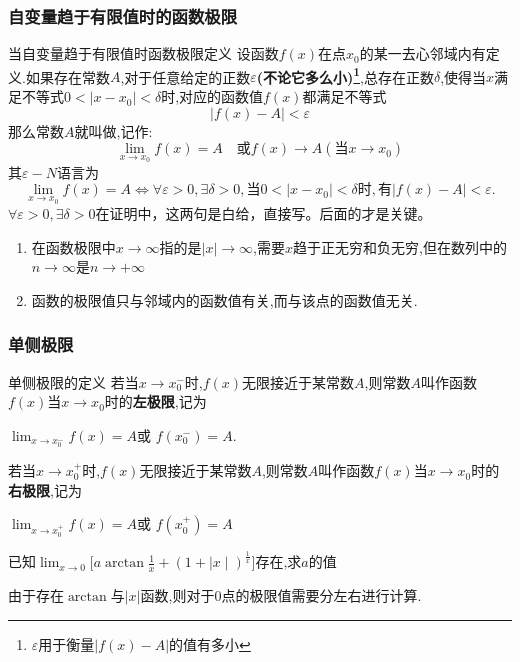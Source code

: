 \documentclass[12pt, a4paper, oneside, UTF8]{ctexbook}
\begin{document}
\begin{sloppypar}
    \subsubsection{自变量趋于有限值时的函数极限}
    \begin{defn}{当自变量趋于有限值时函数极限定义}{}
        设函数$f(x)$在点$x_0$的某一去心邻域内有定义.如果存在常数$A$,对于任意给定的正数$\varepsilon$\textbf{(不论它多么小)\footnote{$\varepsilon$用于衡量$|f(x)-A|$的值有多小}},总存在正数$\delta$,使得当$x$满足不等式$0<|x-x_0|<\delta$时,对应的函数值$f(x)$都满足不等式
        $$
            |f(x)-A|<\varepsilon
        $$
        那么常数$A$就叫做,记作:
        $$
            \lim_{x\to x_0}f(x)=A\quad\text{或}f(x)\to A(\text{当}x\to x_0)
        $$
        其$\varepsilon-N$语言为
        $$
            \lim_{x\to x_0}f(x)=A\Leftrightarrow\forall\varepsilon>0,\exists\delta>0,\text{当}0<|x-x_0|<\delta\text{时},\text{有}|f(x)-A|<\varepsilon.
        $$
        $\forall\varepsilon>0,\exists\delta>0$在证明中，这两句是白给，直接写。后面的才是关键。
    \end{defn}
    \begin{criterion}{}{}
        \begin{enumerate}
            \item 在函数极限中$x \to \infty$指的是$|x| \to \infty$,需要$x$趋于正无穷和负无穷,但在数列中的$n \to \infty$是$n \to +\infty$
            \item 函数的极限值只与邻域内的函数值有关,而与该点的函数值无关.
        \end{enumerate}
    \end{criterion}
    \subsubsection{单侧极限}
    \begin{defn}{单侧极限的定义}{}
        若当$x\to x_0^{-}$时,$f(x)$无限接近于某常数$A$,则常数$A$叫作函数$f(x)$当$x\to x_0$时的\textbf{左极限},记为
        \begin{center}
            $\operatorname*{lim}_{x\to x_0^{-}}f(x)=A$或 $f(x_0^{-})=A$.
        \end{center}
        若当$x\to x_0^+$时,$f(x)$无限接近于某常数$A$,则常数$A$叫作函数$f(x)$当$x\to x_0$时的\textbf{右极限},记为
        \begin{center}
            $\operatorname*{lim}_{x\to x_0^{+}}f(x)=A$或 $f(x_0^{+})=A$
        \end{center}
    \end{defn}
    \begin{problem}
    $\text{已知}\lim_{x\to0}\biggl[a\arctan\frac{1}{x}+(1+\mid x\mid)^{\frac{1}{x}}\biggr]\text{存在,求}a\text{的值}$
    \end{problem}
    \begin{solution}
        由于存在$\arctan$与$|x|$函数,则对于0点的极限值需要分左右进行计算.


\end{solution}
\end{sloppypar}
\end{document}
